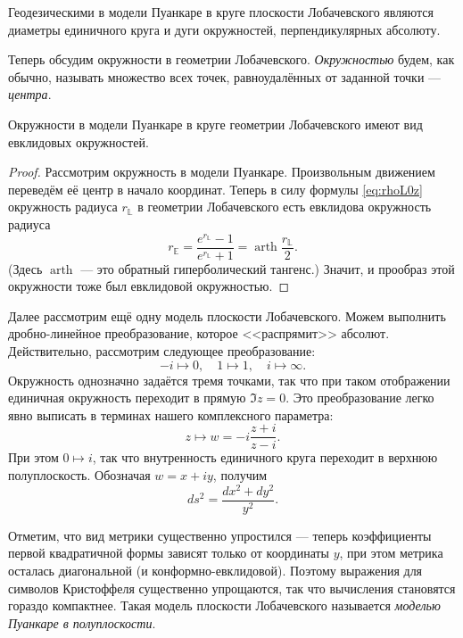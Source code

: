 \begin{proposition}
	Геодезическими в модели Пуанкаре в круге плоскости Лобачевского являются диаметры единичного круга и дуги окружностей, перпендикулярных абсолюту.
\end{proposition}

Теперь обсудим окружности в геометрии Лобачевского. \textit{Окружностью} будем, как обычно, называть множество всех точек, равноудалённых от заданной точки --- \textit{центра}.

\begin{proposition}
	Окружности в модели Пуанкаре в круге геометрии Лобачевского имеют вид евклидовых окружностей.
\end{proposition}

\begin{proof}
	Рассмотрим окружность в модели Пуанкаре. Произвольным движением переведём её центр в начало координат. Теперь в силу формулы \eqref{eq:rhoL0z} окружность радиуса $r_{\mathbb{L}}$ в геометрии Лобачевского есть евклидова окружность радиуса
	\begin{equation} \label{eq:LtoE}
		r_{\mathbb{E}} = \frac{e^{r_{\mathbb{L}}} - 1}{e^{r_{\mathbb{L}}} + 1} = \operatorname{arth}\frac{r_{\mathbb{L}}}{2}.
	\end{equation}
	(Здесь $\operatorname{arth}$ --- это обратный гиперболический тангенс.) Значит, и прообраз этой окружности тоже был евклидовой окружностью.
\end{proof}

Далее рассмотрим ещё одну модель плоскости Лобачевского. Можем выполнить дробно-линейное преобразование, которое <<распрямит>> абсолют. Действительно, рассмотрим следующее преобразование:
\[
	-i \mapsto 0,\quad 1 \mapsto 1,\quad i \mapsto \infty.
\]
Окружность однозначно задаётся тремя точками, так что при таком отображении единичная окружность переходит в прямую $\Im z = 0$. Это преобразование легко явно выписать в терминах нашего комплексного параметра:
\[
	z \mapsto w = -i\frac{z + i}{z - i}.
\]
При этом $0 \mapsto i$, так что внутренность единичного круга переходит в верхнюю полуплоскость. Обозначая $w = x + iy$, получим
\[
	ds^2 = \frac{dx^2 + dy^2}{y^2}.
\]

Отметим, что вид метрики существенно упростился --- теперь коэффициенты первой квадратичной формы зависят только от координаты $y$, при этом метрика осталась диагональной (и конформно-евклидовой). Поэтому выражения для символов Кристоффеля существенно упрощаются, так что вычисления становятся гораздо компактнее. Такая модель плоскости Лобачевского называется \textit{моделью Пуанкаре в полуплоскости}.

